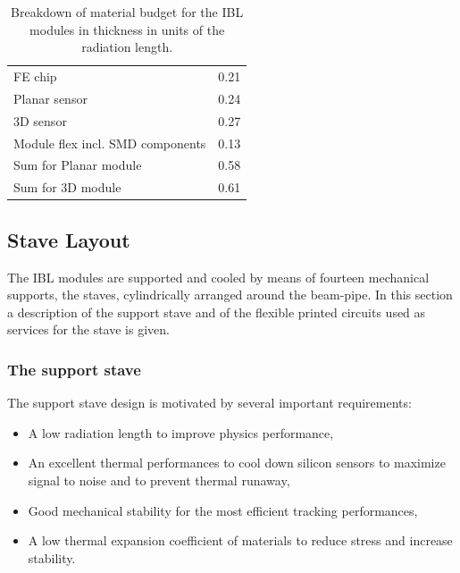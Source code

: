 \begin{table}
\centering
\begin{tabular}{lc}
\hline \hline
	 & \SI{}{\xzero}\\
\hline
FE chip & 0.21 \\
Planar sensor & 0.24 \\
3D sensor & 0.27 \\
Module flex incl. SMD components & 0.13 \\
\hline
Sum for Planar module & 0.58\\
Sum for 3D module &  0.61\\
\hline \hline
\end{tabular}	
\caption{Breakdown of material budget for the IBL modules in thickness in units of the radiation length.}
\label{tab:module_x0}
\end{table}


\subsection{Stave Layout}

The IBL modules are supported and cooled by means of fourteen mechanical supports, the staves, cylindrically arranged around the beam-pipe. In this section a description of the support stave and of the flexible printed circuits used as services for the stave is given.


\subsubsection{The support stave}

The support stave design is motivated by several important requirements:
\begin{itemize}
\item A low radiation length to improve physics performance,
\item An excellent thermal performances to cool down silicon sensors to maximize signal to noise and to prevent thermal runaway,
\item Good mechanical stability for the most efficient tracking performances,
\item A low thermal expansion coefficient of materials to reduce stress and increase stability.
\end{itemize}

